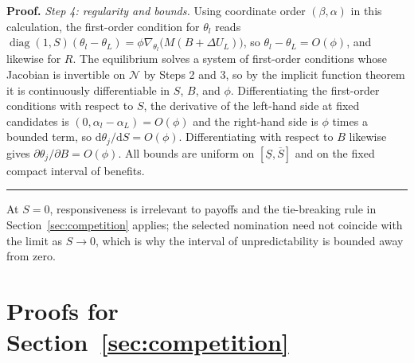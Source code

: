 \documentclass[12pt,letterpaper]{article}
\newenvironment{proof}[1][Proof]{\noindent\textbf{#1.} }{\ \rule{0.5em}{0.5em}}
\begin{document}
\begin{proof}
\emph{Step 4: regularity and bounds.} Using coordinate order $(\beta,\alpha)$ in this calculation, the first-order condition for $\theta_l$ reads $\operatorname{diag}(1,S)(\theta_l-\theta_L)=\phi\nabla_{\theta_l}\big(M(B+\Delta U_L)\big)$, so $\theta_l-\theta_L=O(\phi)$, and likewise for $R$. The equilibrium solves a system of first-order conditions whose Jacobian is invertible on $\mathcal{N}$ by Steps 2 and 3, so by the implicit function theorem it is continuously differentiable in $S$, $B$, and $\phi$. Differentiating the first-order conditions with respect to $S$, the derivative of the left-hand side at fixed candidates is $(0,\alpha_l-\alpha_L)=O(\phi)$ and the right-hand side is $\phi$ times a bounded term, so $\mathrm{d}\theta_j/\mathrm{d}S=O(\phi)$. Differentiating with respect to $B$ likewise gives $\partial\theta_j/\partial B=O(\phi)$. All bounds are uniform on $[\underline S,\overline S]$ and on the fixed compact interval of benefits.
\end{proof}

At $S=0$, responsiveness is irrelevant to payoffs and the tie-breaking rule in Section~\ref{sec:competition} applies; the selected nomination need not coincide with the limit as $S\to0$, which is why the interval of unpredictability is bounded away from zero.


\section{Proofs for Section~\ref{sec:competition}}
\end{document}
